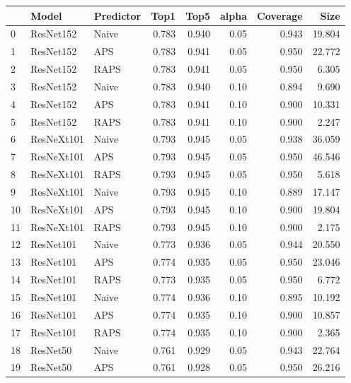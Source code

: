 \begin{tabular}{lllrrrrr}
\toprule
{} &        Model & Predictor &   Top1 &   Top5 &  alpha &  Coverage &     Size \\
\midrule
0  &    ResNet152 &     Naive &  0.783 &  0.940 &   0.05 &     0.943 &   19.804 \\
1  &    ResNet152 &       APS &  0.783 &  0.941 &   0.05 &     0.950 &   22.772 \\
2  &    ResNet152 &      RAPS &  0.783 &  0.941 &   0.05 &     0.950 &    6.305 \\
3  &    ResNet152 &     Naive &  0.783 &  0.940 &   0.10 &     0.894 &    9.690 \\
4  &    ResNet152 &       APS &  0.783 &  0.941 &   0.10 &     0.900 &   10.331 \\
5  &    ResNet152 &      RAPS &  0.783 &  0.941 &   0.10 &     0.900 &    2.247 \\
6  &   ResNeXt101 &     Naive &  0.793 &  0.945 &   0.05 &     0.938 &   36.059 \\
7  &   ResNeXt101 &       APS &  0.793 &  0.945 &   0.05 &     0.950 &   46.546 \\
8  &   ResNeXt101 &      RAPS &  0.793 &  0.945 &   0.05 &     0.950 &    5.618 \\
9  &   ResNeXt101 &     Naive &  0.793 &  0.945 &   0.10 &     0.889 &   17.147 \\
10 &   ResNeXt101 &       APS &  0.793 &  0.945 &   0.10 &     0.900 &   19.804 \\
11 &   ResNeXt101 &      RAPS &  0.793 &  0.945 &   0.10 &     0.900 &    2.175 \\
12 &    ResNet101 &     Naive &  0.773 &  0.936 &   0.05 &     0.944 &   20.550 \\
13 &    ResNet101 &       APS &  0.774 &  0.935 &   0.05 &     0.950 &   23.046 \\
14 &    ResNet101 &      RAPS &  0.773 &  0.935 &   0.05 &     0.950 &    6.772 \\
15 &    ResNet101 &     Naive &  0.774 &  0.936 &   0.10 &     0.895 &   10.192 \\
16 &    ResNet101 &       APS &  0.774 &  0.935 &   0.10 &     0.900 &   10.857 \\
17 &    ResNet101 &      RAPS &  0.774 &  0.935 &   0.10 &     0.900 &    2.365 \\
18 &     ResNet50 &     Naive &  0.761 &  0.929 &   0.05 &     0.943 &   22.764 \\
19 &     ResNet50 &       APS &  0.761 &  0.928 &   0.05 &     0.950 &   26.216 \\

\end{tabular}
